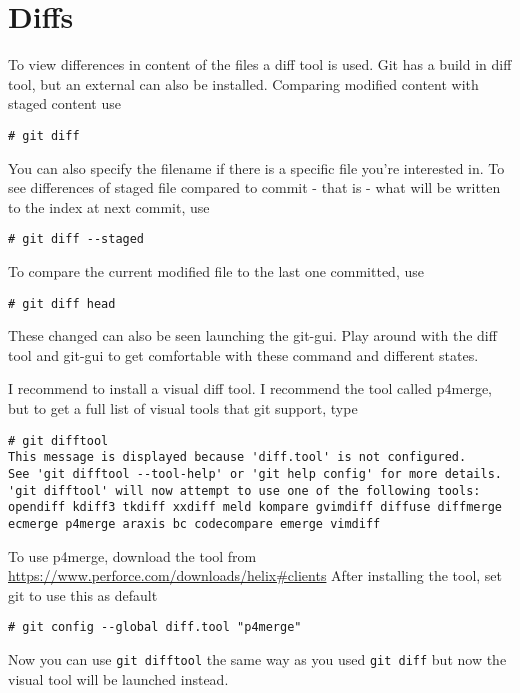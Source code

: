 \documentclass[10pt,a4paper]{article}
\begin{document}
\section{Diffs}
To view differences in content of the files a diff tool is used. Git has a build in diff tool, but an external can also be installed. Comparing modified content with staged content use
\begin{lstlisting}
# git diff
\end{lstlisting}
You can also specify the filename if there is a specific file you're interested in. To see differences of staged file compared to commit - that is - what will be written to the index at next commit, use
\begin{lstlisting}
# git diff --staged
\end{lstlisting}
To compare the current modified file to the last one committed, use 
\begin{lstlisting}
# git diff head
\end{lstlisting}

These changed can also be seen launching the git-gui. Play around with the diff tool and git-gui to get comfortable with these command and different states.

I recommend to install a visual diff tool. I recommend the tool called p4merge, but to get a full list of visual tools that git support, type 
\begin{lstlisting}
# git difftool
This message is displayed because 'diff.tool' is not configured.
See 'git difftool --tool-help' or 'git help config' for more details.
'git difftool' will now attempt to use one of the following tools:
opendiff kdiff3 tkdiff xxdiff meld kompare gvimdiff diffuse diffmerge ecmerge p4merge araxis bc codecompare emerge vimdiff
\end{lstlisting}
To use p4merge, download the tool from\\
\url{https://www.perforce.com/downloads/helix#clients}
After installing the tool, set git to use this as default
\begin{lstlisting}
# git config --global diff.tool "p4merge"
\end{lstlisting}
Now you can use \texttt{git difftool} the same way as you used \texttt{git diff} but now the visual tool will be launched instead.

\end{document}
